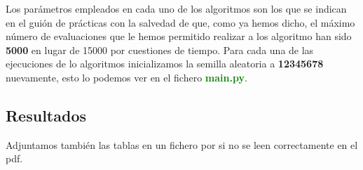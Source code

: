 \documentclass[10pt,a4paper]{article}
\begin{document}
Los parámetros empleados en cada uno de los algoritmos son los que se indican en el guión de prácticas con la salvedad de que, como ya hemos dicho, el máximo número de evaluaciones que le hemos permitido realizar a los algoritmo han sido \textbf{5000} en lugar de 15000 por cuestiones de tiempo. Para cada una de las ejecuciones de lo algoritmos inicializamos la semilla aleatoria a \textbf{12345678} nuevamente, esto lo podemos ver en el fichero \textbf{\textcolor{green}{main.py}}.\\


\subsection{\color[rgb]{0.0,0.0,0.51}Resultados}

Adjuntamos también las tablas en un fichero por si no se leen correctamente en el pdf.
\end{document}
